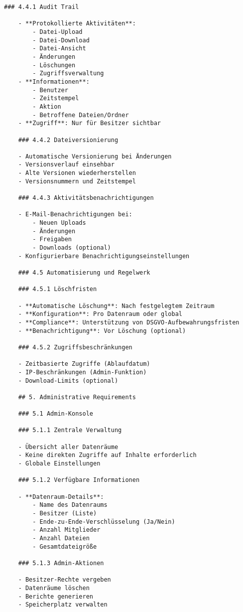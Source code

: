 \begin{Verbatim}[breaklines=true]
    ### 4.4.1 Audit Trail
    
    - **Protokollierte Aktivitäten**:
        - Datei-Upload
        - Datei-Download
        - Datei-Ansicht
        - Änderungen
        - Löschungen
        - Zugriffsverwaltung
    - **Informationen**:
        - Benutzer
        - Zeitstempel
        - Aktion
        - Betroffene Dateien/Ordner
    - **Zugriff**: Nur für Besitzer sichtbar
    
    ### 4.4.2 Dateiversionierung
    
    - Automatische Versionierung bei Änderungen
    - Versionsverlauf einsehbar
    - Alte Versionen wiederherstellen
    - Versionsnummern und Zeitstempel
    
    ### 4.4.3 Aktivitätsbenachrichtigungen
    
    - E-Mail-Benachrichtigungen bei:
        - Neuen Uploads
        - Änderungen
        - Freigaben
        - Downloads (optional)
    - Konfigurierbare Benachrichtigungseinstellungen
    
    ### 4.5 Automatisierung und Regelwerk
    
    ### 4.5.1 Löschfristen
    
    - **Automatische Löschung**: Nach festgelegtem Zeitraum
    - **Konfiguration**: Pro Datenraum oder global
    - **Compliance**: Unterstützung von DSGVO-Aufbewahrungsfristen
    - **Benachrichtigung**: Vor Löschung (optional)
    
    ### 4.5.2 Zugriffsbeschränkungen
    
    - Zeitbasierte Zugriffe (Ablaufdatum)
    - IP-Beschränkungen (Admin-Funktion)
    - Download-Limits (optional)
    
    ## 5. Administrative Requirements
    
    ### 5.1 Admin-Konsole
    
    ### 5.1.1 Zentrale Verwaltung
    
    - Übersicht aller Datenräume
    - Keine direkten Zugriffe auf Inhalte erforderlich
    - Globale Einstellungen
    
    ### 5.1.2 Verfügbare Informationen
    
    - **Datenraum-Details**:
        - Name des Datenraums
        - Besitzer (Liste)
        - Ende-zu-Ende-Verschlüsselung (Ja/Nein)
        - Anzahl Mitglieder
        - Anzahl Dateien
        - Gesamtdateigröße
    
    ### 5.1.3 Admin-Aktionen
    
    - Besitzer-Rechte vergeben
    - Datenräume löschen
    - Berichte generieren
    - Speicherplatz verwalten
    

\end{Verbatim}

